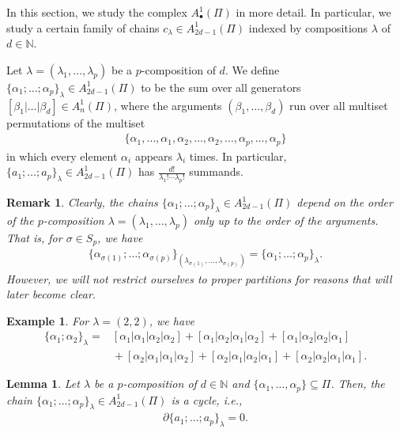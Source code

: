 \documentclass[10pt,a4paper]{amsart}
\numberwithin{equation}{section}
\newtheorem{Lemma}[Theorem]{Lemma}
\newtheorem{Example}[Theorem]{Example}
\newtheorem{Remark}[Theorem]{Remark}
\newcommand{\NN }{\mathbb{N}}
\begin{document}
In this section, we study the complex $A^1_\bullet(\Pi)$ in more detail. In particular, we study a certain family of chains $c_\lambda \in A^1_{2d-1}(\Pi)$ indexed by compositions $\lambda$ of $d \in \NN$.

Let $\lambda = (\lambda_1, \dots, \lambda_p)$ be a $p$-composition of $d$. We define $\{\alpha_1;\dots ;\alpha_p\}_\lambda \in A_{2d-1}^1(\Pi)$ to be the sum over all generators $[\beta_1 |\dots |\beta_d] \in A_n^1(\Pi)$, where the arguments $(\beta_1, \dots,\beta_d)$ run over all multiset permutations of the multiset
\begin{align*}
 \{\alpha_1, \dots, \alpha_1,\alpha_2, \dots, \alpha_2, \dots, \alpha_p, \dots , \alpha_p \}
\end{align*}
in which every element $\alpha_i$ appears $\lambda_i$ times. In particular, $\{a_1;\dots ;a_p\}_\lambda \in A_{2d-1}^1(\Pi)$ has $\frac{d!}{\lambda_1! \cdots \lambda_p!}$ summands.

\begin{Remark}\label{rem: symmetric chains don't depend on order of composition}
 Clearly, the chains $\{\alpha_1;\dots ;\alpha_p\}_\lambda \in A_{2d-1}^1(\Pi)$ depend on the order of the $p$-composition $\lambda=(\lambda_1, \dots, \lambda_p)$ only up to the order of the arguments. That is, for $\sigma \in S_p$, we have
 \begin{align*}
 \{\alpha_{\sigma(1)};\dots;\alpha_{\sigma(p)}\}_{(\lambda_{\sigma(1)},\dots,\lambda_{\sigma(p)})}=\{\alpha_1;\dots; \alpha_p\}_\lambda.
 \end{align*}
 However, we will not restrict ourselves to proper partitions for reasons that will later become clear.
\end{Remark}

\begin{Example}
For $\lambda=(2,2)$, we have
\begin{align*}
 \{ \alpha_1; \alpha_2\}_\lambda ={}& [\alpha_1|\alpha_1|\alpha_2|\alpha_2] + [\alpha_1|\alpha_2|\alpha_1|\alpha_2] + [\alpha_1|\alpha_2|\alpha_2|\alpha_1] \\
 &{}+ [\alpha_2|\alpha_1|\alpha_1|\alpha_2] + [\alpha_2|\alpha_1|\alpha_2|\alpha_1] + [\alpha_2|\alpha_2|\alpha_1|\alpha_1].
\end{align*}
\end{Example}

\begin{Lemma}\label{eq: symmetric chains are cycles}
Let $\lambda$ be a $p$-composition of $d \in \NN$ and $\{\alpha_1,\dots,\alpha_p\} \subseteq \Pi$.
Then, the chain $\{\alpha_1;\dots ;\alpha_p\}_\lambda \in A_{2d-1}^1(\Pi)$ is a cycle, i.e.,
\begin{gather*}
 \partial \{a_1;\dots ;a_p\}_\lambda =0.
\end{gather*}
\end{Lemma}
\end{document}
